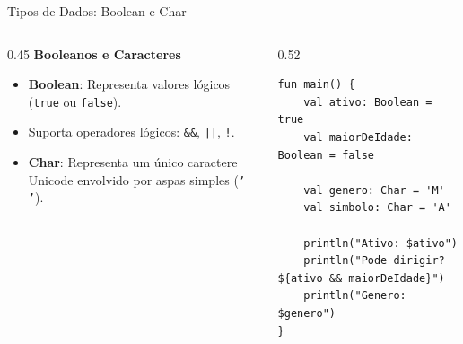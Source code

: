 \documentclass[aspectratio=169]{beamer}
\begin{document}
\begin{frame}[fragile]{Tipos de Dados: Boolean e Char}
  \begin{columns}[T]
    \begin{column}{0.45\textwidth}
      \textbf{Booleanos e Caracteres}
      \vspace{0.3em}
      \begin{itemize}\small
        \item \textbf{Boolean}: Representa valores lógicos (\texttt{true} ou \texttt{false}).
        \item Suporta operadores lógicos: \texttt{\&\&}, \texttt{||}, \texttt{!}.
        \item \textbf{Char}: Representa um único caractere Unicode envolvido por aspas simples (\texttt{' '}).
      \end{itemize}
    \end{column}
    \begin{column}{0.52\textwidth}
\begin{lstlisting}[style=KotlinStyle]
fun main() {
    val ativo: Boolean = true
    val maiorDeIdade: Boolean = false
    
    val genero: Char = 'M'
    val simbolo: Char = 'A'

    println("Ativo: $ativo")
    println("Pode dirigir? ${ativo && maiorDeIdade}")
    println("Genero: $genero")
}
\end{lstlisting}
    \end{column}
  \end{columns}
\end{frame}
\end{document}
